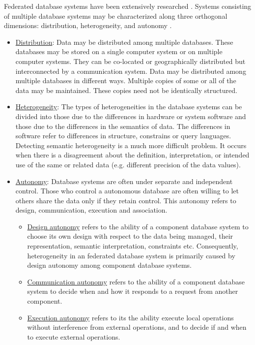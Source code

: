 \documentclass[12pt,a4paper]{report}
\renewcommand{\emph}{\underline}
\begin{document}
	Federated database systems have been extensively researched \citep{Sheth, Litwin}.
	Systems consisting of multiple database systems may be characterized along three orthogonal dimensions: distribution, heterogeneity, and autonomy \citep{Sheth}. 
	\begin{itemize}
		\item \emph{Distribution}: Data may be distributed among multiple databases. These databases may be stored on a single computer system or on multiple computer systems. They can be co-located or geographically distributed but interconnected by a communication system. Data may be distributed among multiple databases in different ways. Multiple copies of some or all of the data may be maintained. These copies need not be identically structured.
		\item \emph{Heterogeneity}: The types of heterogeneities in the database systems can be divided into those due to the differences in hardware or system software and those due to the differences in the semantics of data. The differences in software refer to differences in structure, constrains or query languages. Detecting semantic heterogeneity is a much more difficult problem. It occurs when there is a disagreement about the definition, interpretation, or intended use of the same or related data (e.g. different precision of the data values). 
		\item \emph{Autonomy}: Database systems are often under separate and independent control. Those who control a autonomous database are often willing to let others share the data only if they retain control. This autonomy refers to design, communication, execution and association. 
		\begin{itemize}
			\item \emph{Design autonomy} refers to the ability of a component database system to choose its own design with respect to the data being managed, their representation, semantic interpretation, constraints etc. Consequently, heterogeneity in an federated database system is primarily caused by design autonomy among component database systems. 
			\item \emph{Communication autonomy} refers to the ability of a component database system to decide when and how it responds to a request from another component. 
			\item \emph{Execution autonomy} refers to its the ability execute local operations without interference from external operations, and to decide if and when to execute external operations. 
		\end{itemize}
	\end{itemize} 
	
\end{document}
